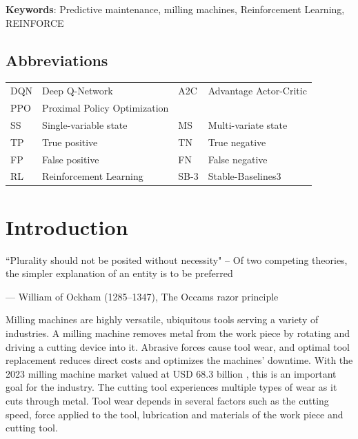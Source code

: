 \documentclass[a4paper, 12pt]{article}
\newcommand{\rowspace}[1]{\renewcommand{\arraystretch}{#1}}
\begin{document}
\noindent \textbf{Keywords}: Predictive maintenance, milling machines, Reinforcement Learning, REINFORCE

\subsection*{Abbreviations}

\begin{table}[!htbp]\centering
	\sffamily
	\rowspace{1.3}
	\begin{tabular}{L{1cm} L{4.5cm} L{1cm} L{4.5cm}}
		\toprule	
		
		DQN & Deep Q-Network & A2C & Advantage Actor-Critic\\
		PPO & Proximal Policy Optimization & & \\
		SS & Single-variable state & MS & Multi-variate state\\
		TP &True positive &TN &True negative\\
		FP &False positive &FN &False negative\\
		RL & Reinforcement Learning & SB-3 & Stable-Baselines3\\

		\bottomrule
	\end{tabular}
	\label{tbl:abbrev}
\end{table}

\newpage
\section{Introduction}
\epigraph{``Plurality should not be posited without necessity" -- Of two competing theories, the simpler explanation of an entity is to be preferred}{--- \textup{William of Ockham (1285–1347)}, The Occams razor principle}

Milling machines are highly versatile, ubiquitous tools serving a variety of industries. A milling machine removes metal from the work piece by rotating and driving a cutting device into it. Abrasive forces cause tool wear, and optimal tool replacement reduces direct costs and optimizes the machines' downtime. With the 2023 milling machine market valued at USD 68.3 billion \citep{milling-market}, this is an important goal for the industry. The cutting tool experiences multiple types of wear as it cuts through metal. Tool wear depends in several factors such as the cutting speed, force applied to the tool, lubrication and materials of the work piece and cutting tool. 
\end{document}
